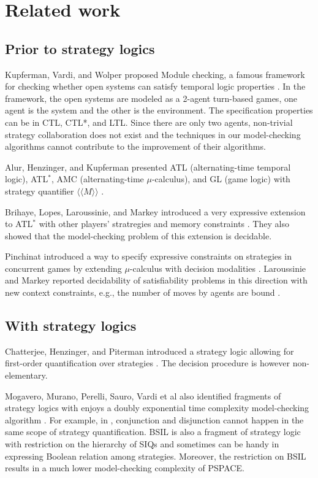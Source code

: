 \documentclass[11pt]{article}
\newcommand{\ldabrac}{\langle\!\langle}
\newcommand{\rdabrac}{\rangle\!\rangle}
\begin{document}
\section{Related work \label{sec.relwork}}

\subsection{Prior to strategy logics} 

Kupferman, Vardi, and Wolper proposed 
Module checking, a famous framework for checking 
whether open systems can satisfy temporal logic properties \cite{KVW01}.  
\label{reply3.module.checking}   
In the framework, the open systems are modeled as a 2-agent 
turn-based games, one agent is the system and the other is the environment. 
The specification properties can be in CTL, CTL*, and LTL.  
Since there are only two agents, non-trivial strategy collaboration 
does not exist and the techniques in our model-checking algorithms
cannot contribute to the improvement of their algorithms. 

Alur, Henzinger, and Kupferman 
presented ATL (alternating-time temporal logic), 
ATL$^*$, AMC (alternating-time $\mu$-calculus), and GL (game logic)
with strategy quantifier $\ldabrac M\rdabrac$ \cite{AHK02}.  
 
Brihaye, Lopes, Laroussinie, and Markey introduced a very expressive 
extension to ATL$^*$ \label{reply3.laroussinie}
with other players' stratregies and memory constraints \cite{BLLM09}.  
They also showed that the model-checking problem of this extension is 
decidable. 

Pinchinat introduced a way to specify expressive constraints on strategies 
in concurrent games by extending $\mu$-calculus with decision modalities 
\cite{Pinchinat07}. 
Laroussinie and Markey reported decidability of satisfiability problems 
in this direction with new context constraints, \label{reply3.gandalf13} 
e.g., the number of moves by agents are bound \cite{LM13}. 


\subsection{With strategy logics} 

Chatterjee, Henzinger, and Piterman introduced a strategy logic allowing for 
first-order quantification over strategies \cite{CHP10}.  
The decision procedure is however non-elementary.  

Mogavero, Murano, Perelli, Sauro, Vardi et al also identified fragments of 
strategy logics with 
enjoys a doubly exponential time complexity model-checking algorithm 
\cite{MMV10,MMPV12,MMS13}.  \label{reply3.2recent} 
For example, in \cite{MMS13}, conjunction 
and disjunction cannot happen in the same scope of 
strategy quantification.  
BSIL is also a fragment of strategy logic with restriction 
on the hierarchy of SIQs and sometimes can be handy in expressing 
Boolean relation among strategies.  
Moreover, the restriction on BSIL results in a much lower model-checking complexity of PSPACE.  
\end{document}
